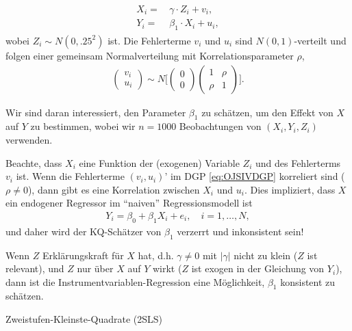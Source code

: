 \documentclass[
  a4paper,
  DIV=11,
  oneside]{scrreprt}
\begin{document}
\begin{align}
  \begin{split}
    X_i =&\, \gamma \cdot Z_i + v_i,\\
    Y_i =&\, \beta_1 \cdot X_i + u_i,
  \end{split}
  \label{eq:OJSIVDGP}
\end{align} wobei \(Z_i \sim N(0, .25^2)\) ist. Die Fehlerterme \(v_i\)
und \(u_i\) sind \(N(0,1)\)-verteilt und folgen einer gemeinsam
Normalverteilung mit Korrelationsparameter \(\rho\), \begin{align}
\begin{pmatrix}
v_i \\ u_i
\end{pmatrix}
\sim N
\bigg[
\begin{pmatrix}
0 \\ 0
\end{pmatrix}
\begin{pmatrix}
1 & \rho \\
\rho & 1
\end{pmatrix}
\bigg].
\end{align}

Wir sind daran interessiert, den Parameter \(\beta_1\) zu schätzen, um
den Effekt von \(X\) auf \(Y\) zu bestimmen, wobei wir \(n=1000\)
Beobachtungen von \((X_i, Y_i, Z_i)\) verwenden.

Beachte, dass \(X_i\) eine Funktion der (exogenen) Variable \(Z_i\) und
des Fehlerterms \(v_i\) ist. Wenn die Fehlerterme \((v_i, u_i)’\) im DGP
\eqref{eq:OJSIVDGP} korreliert sind (\(\rho\neq0\)), dann gibt es eine
Korrelation zwischen \(X_i\) und \(u_i\). Dies impliziert, dass \(X\)
ein endogener Regressor im ``naiven'' Regressionsmodell ist
\begin{align}
Y_i = \beta_0 + \beta_1 X_i + e_i, \quad i = 1,\dots,N,
\end{align} und daher wird der KQ-Schätzer von \(\beta_1\) verzerrt und
inkonsistent sein!

Wenn \(Z\) Erklärungskraft für \(X\) hat, d.h. \(\gamma\neq0\) mit
\(|\gamma|\) nicht zu klein (\(Z\) ist relevant), und \(Z\) nur über
\(X\) auf \(Y\) wirkt (\(Z\) ist exogen in der Gleichung von \(Y_i\)),
dann ist die Instrumentvariablen-Regression eine Möglichkeit,
\(\beta_1\) konsistent zu schätzen.

Zweistufen-Kleinste-Quadrate (2SLS)
\end{document}
